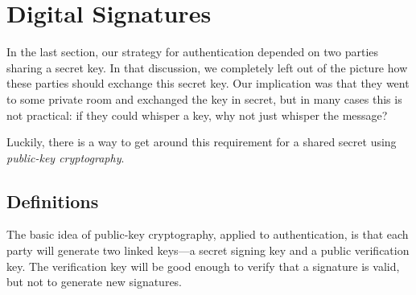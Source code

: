 \chapter{Digital Signatures}
\label{sec:sig}

In the last section, our strategy for
authentication depended on two parties sharing a
secret key.
In that discussion, we completely left
out of the picture how these parties should
exchange this secret key.
Our implication was that they
went to some private room and exchanged the key in
secret, but in many cases this is not practical:
if they could whisper a key, why not just whisper the message?

Luckily, there is a way to get around this requirement for a shared secret using \emph{public-key cryptography}.\autocite{DH76} %

\section{Definitions}
The basic idea of public-key cryptography, applied
to authentication, is that each party will
generate two linked keys---a secret signing key
and a public verification key.
The verification key will be good enough to verify that a signature
is valid, but not to generate new signatures.

